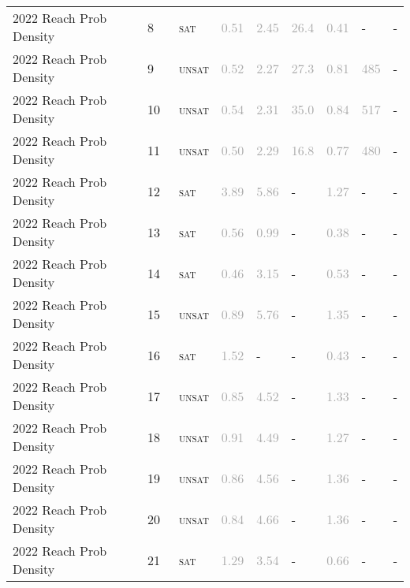 \begin{center}
{\begin{longtable}{@{}lllllllll@{}}
2022 Reach Prob Density & 8 & ~\textsc{sat} & \textcolor{darkgray}{0.51} & \textcolor{darkgray}{2.45} & \textcolor{darkgray}{26.4} & \textcolor{darkgray}{0.41} & - & - \\
2022 Reach Prob Density & 9 & ~\textsc{unsat} & \textcolor{darkgray}{0.52} & \textcolor{darkgray}{2.27} & \textcolor{darkgray}{27.3} & \textcolor{darkgray}{0.81} & \textcolor{darkgray}{485} & - \\
2022 Reach Prob Density & 10 & ~\textsc{unsat} & \textcolor{darkgray}{0.54} & \textcolor{darkgray}{2.31} & \textcolor{darkgray}{35.0} & \textcolor{darkgray}{0.84} & \textcolor{darkgray}{517} & - \\
2022 Reach Prob Density & 11 & ~\textsc{unsat} & \textcolor{darkgray}{0.50} & \textcolor{darkgray}{2.29} & \textcolor{darkgray}{16.8} & \textcolor{darkgray}{0.77} & \textcolor{darkgray}{480} & - \\
2022 Reach Prob Density & 12 & ~\textsc{sat} & \textcolor{darkgray}{3.89} & \textcolor{darkgray}{5.86} & - & \textcolor{darkgray}{1.27} & - & - \\
2022 Reach Prob Density & 13 & ~\textsc{sat} & \textcolor{darkgray}{0.56} & \textcolor{darkgray}{0.99} & - & \textcolor{darkgray}{0.38} & - & - \\
2022 Reach Prob Density & 14 & ~\textsc{sat} & \textcolor{darkgray}{0.46} & \textcolor{darkgray}{3.15} & - & \textcolor{darkgray}{0.53} & - & - \\
2022 Reach Prob Density & 15 & ~\textsc{unsat} & \textcolor{darkgray}{0.89} & \textcolor{darkgray}{5.76} & - & \textcolor{darkgray}{1.35} & - & - \\
2022 Reach Prob Density & 16 & ~\textsc{sat} & \textcolor{darkgray}{1.52} & - & - & \textcolor{darkgray}{0.43} & - & - \\
2022 Reach Prob Density & 17 & ~\textsc{unsat} & \textcolor{darkgray}{0.85} & \textcolor{darkgray}{4.52} & - & \textcolor{darkgray}{1.33} & - & - \\
2022 Reach Prob Density & 18 & ~\textsc{unsat} & \textcolor{darkgray}{0.91} & \textcolor{darkgray}{4.49} & - & \textcolor{darkgray}{1.27} & - & - \\
2022 Reach Prob Density & 19 & ~\textsc{unsat} & \textcolor{darkgray}{0.86} & \textcolor{darkgray}{4.56} & - & \textcolor{darkgray}{1.36} & - & - \\
2022 Reach Prob Density & 20 & ~\textsc{unsat} & \textcolor{darkgray}{0.84} & \textcolor{darkgray}{4.66} & - & \textcolor{darkgray}{1.36} & - & - \\
2022 Reach Prob Density & 21 & ~\textsc{sat} & \textcolor{darkgray}{1.29} & \textcolor{darkgray}{3.54} & - & \textcolor{darkgray}{0.66} & - & - \\

\end{longtable}}
\end{center}
